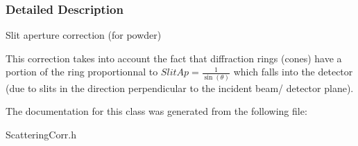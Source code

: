\subsubsection{\-Detailed \-Description}
\-Slit aperture correction (for powder) 

\-This correction takes into account the fact that diffraction rings (cones) have a portion of the ring proportionnal to $ SlitAp = \frac{1}{\sin(\theta)} $ which falls into the detector (due to slits in the direction perpendicular to the incident beam/ detector plane). 

\-The documentation for this class was generated from the following file\-:\begin{DoxyCompactItemize}
\item 
\-Scattering\-Corr.\-h\end{DoxyCompactItemize}
